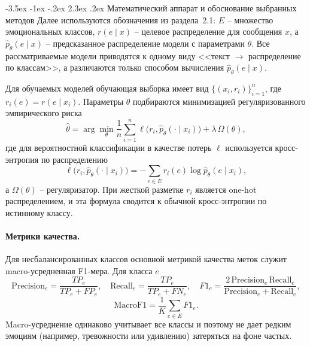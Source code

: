 \documentclass[12pt,a4paper]{report}
\makeatletter
\renewcommand{\section}{\@startsection{section}{1}{\z@}%
  {-3.5ex \@plus -1ex \@minus -.2ex}%
  {2.3ex \@plus .2ex}%
  {\normalfont\large\bfseries\centering}}
\makeatother
\begin{document}
\section{Математический аппарат и обоснование выбранных методов}
Далее используются обозначения из раздела~2.1: \(E\) -- множество эмоциональных классов, \(r(e\mid x)\) -- целевое распределение для сообщения \(x\), а \(\hat p_\theta(e\mid x)\) -- предсказанное распределение модели с параметрами \(\theta\). Все рассматриваемые модели приводятся к одному виду <<текст \(\to\) распределение по классам>>, а различаются только способом вычисления \(\hat p_\theta(e\mid x)\).

Для обучаемых моделей обучающая выборка имеет вид \(\{(x_i,r_i)\}_{i=1}^{n}\), где \(r_i(e)=r(e\mid x_i)\). Параметры \(\theta\) подбираются минимизацией регуляризованного эмпирического риска
\[
  \hat\theta = \arg\min_{\theta} \frac{1}{n}\sum_{i=1}^{n} \ell\big(r_i, \hat p_\theta(\cdot\mid x_i)\big) + \lambda\,\Omega(\theta),
\]
где для вероятностной классификации в качестве потерь \(\ell\) используется кросс-энтропия по распределению
\[
  \ell\big(r_i, \hat p_\theta(\cdot\mid x_i)\big) = -\sum_{e\in E} r_i(e)\log \hat p_\theta(e\mid x_i),
\]
а \(\Omega(\theta)\) -- регуляризатор. При жесткой разметке \(r_i\) является one-hot распределением, и эта формула сводится к обычной кросс-энтропии по истинному классу.

\paragraph{Метрики качества.} Для несбалансированных классов основной метрикой качества меток служит macro-усредненная F1-мера. Для класса \(e\)
\[
  \mathrm{Precision}_e = \frac{TP_e}{TP_e + FP_e}, \quad
  \mathrm{Recall}_e = \frac{TP_e}{TP_e + FN_e}, \quad
  F1_e = \frac{2\,\mathrm{Precision}_e\,\mathrm{Recall}_e}{\mathrm{Precision}_e + \mathrm{Recall}_e},
\]
\[
  \mathrm{MacroF1} = \frac{1}{K}\sum_{e\in E} F1_e.
\]
Macro-усреднение одинаково учитывает все классы и поэтому не дает редким эмоциям (например, тревожности или удивлению) затеряться на фоне частых.
\end{document}
